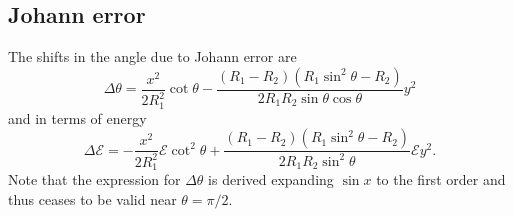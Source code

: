 \documentclass[11pt,a4paper]{article}
\begin{document}
\subsection{Johann error}
The shifts in the angle due to Johann error are
\begin{equation}
\Delta \theta = \frac{x^2}{2 R_1^2} \cot \theta 
- \frac{(R_1 -R_2)(R_1 \sin^2 \theta - R_2)}{2 R_1 R_2 \sin \theta \cos \theta}y^2
\end{equation} 
and in terms of energy
\begin{equation}
\Delta \mathcal{E} = -\frac{x^2}{2 R_1^2} \mathcal{E} \cot^2 \theta
+ \frac{(R_1 -R_2)(R_1 \sin^2 \theta - R_2)}{2 R_1 R_2 \sin^2 \theta} \mathcal{E}  y^2.
\end{equation}
Note that the expression for $\Delta \theta$ is derived expanding $\sin x$ to the first order and thus ceases to be valid near $\theta = \pi/2$.





\end{document}
